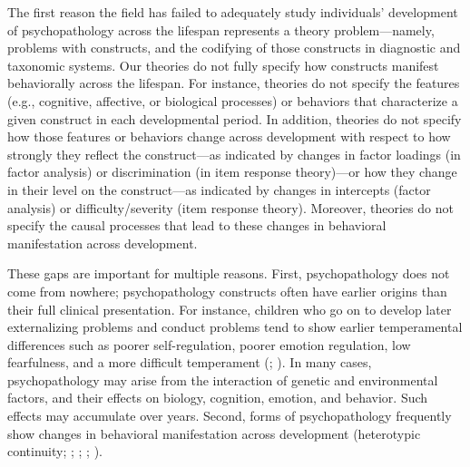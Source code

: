 \documentclass[
  american,
  letterpaper,
  12pt]{article}
\begin{document}
The first reason the field has failed to adequately study individuals'
development of psychopathology across the lifespan represents a theory
problem---namely, problems with constructs, and the codifying of those
constructs in diagnostic and taxonomic systems. Our theories do not
fully specify how constructs manifest behaviorally across the lifespan.
For instance, theories do not specify the features (e.g., cognitive,
affective, or biological processes) or behaviors that characterize a
given construct in each developmental period. In addition, theories do
not specify how those features or behaviors change across development
with respect to how strongly they reflect the construct---as indicated
by changes in factor loadings (in factor analysis) or discrimination (in
item response theory)---or how they change in their level on the
construct---as indicated by changes in intercepts (factor analysis) or
difficulty/severity (item response theory). Moreover, theories do not
specify the causal processes that lead to these changes in behavioral
manifestation across development.

These gaps are important for multiple reasons. First, psychopathology
does not come from nowhere; psychopathology constructs often have
earlier origins than their full clinical presentation. For instance,
children who go on to develop later externalizing problems and conduct
problems tend to show earlier temperamental differences such as poorer
self-regulation, poorer emotion regulation, low fearfulness, and a more
difficult temperament (;
). In many cases,
psychopathology may arise from the interaction of genetic and
environmental factors, and their effects on biology, cognition, emotion,
and behavior. Such effects may accumulate over years. Second, forms of
psychopathology frequently show changes in behavioral manifestation
across development (heterotypic continuity;
;
;
;
).
\end{document}
